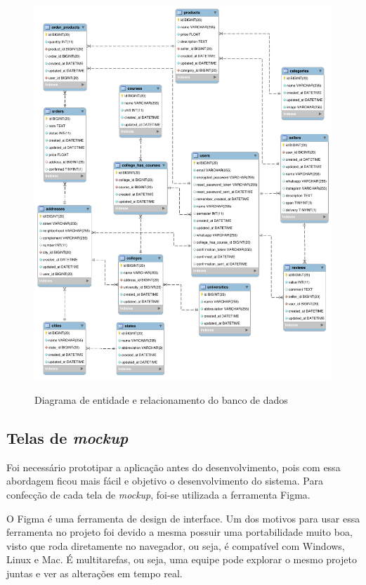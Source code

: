 \begin{figure}[htbp!]
  \centering
  \caption{Diagrama de entidade e relacionamento do banco de dados}
  \includegraphics[width=1\textwidth]{figs/err.png}
    \label{fig:err}
\end{figure}

\subsection{Telas de \textit{mockup}}\label{mockup}
Foi necessário prototipar a aplicação antes do desenvolvimento, pois com essa abordagem ficou mais fácil e objetivo o desenvolvimento do sistema. Para confecção de cada tela de \textit{mockup}, foi-se utilizada a ferramenta Figma.

O Figma é uma ferramenta de design de interface. Um dos motivos para usar essa ferramenta no projeto foi devido a mesma possuir uma portabilidade muito boa, visto que roda diretamente no navegador, ou seja, é compatível com Windows, Linux e Mac. É multitarefas, ou seja, uma equipe pode explorar o mesmo projeto juntas e ver as alterações em tempo real.

